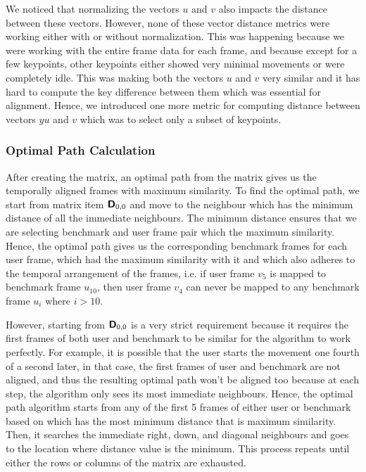 We noticed that normalizing the vectors $u$ and $v$ also impacts the distance between these vectors. However, none of these vector distance metrics were working either with or without normalization. This was happening because we were working with the entire frame data for each frame, and because except for a few keypoints, other keypoints either showed very minimal movements or were completely idle. This was making both the vectors $u$ and $v$ very similar and it has hard to compute the key difference between them which was essential for alignment. Hence, we introduced one more metric for computing distance between vectors $yu$ and $v$ which was to select only a subset of keypoints. 

\subsubsection{Optimal Path Calculation}

After creating the matrix, an optimal path from the matrix gives us the temporally aligned frames with maximum similarity. To find the optimal path, we start from matrix item $\boldsymbol { \mathsf{D}}_{0,0}$ and move to the neighbour which has the minimum distance of all the immediate neighbours. The minimum distance ensures that we are selecting benchmark and user frame pair which the maximum similarity. Hence, the optimal path gives us the corresponding benchmark frames for each user frame, which had the maximum similarity with it and which also adheres to the temporal arrangement of the frames, i.e. if user frame $v_5$ is mapped to benchmark frame $u_{10}$, then user frame $v_4$ can never be mapped to any benchmark frame $u_i$ where $i > 10$. 

However, starting from $\boldsymbol { \mathsf{D}}_{0,0}$ is a very strict requirement because it requires the first frames of both user and benchmark to be similar for the algorithm to work perfectly. For example, it is possible that the user starts the movement one fourth of a second later, in that case, the first frames of user and benchmark are not aligned, and thus the resulting optimal path won't be aligned too because at each step, the algorithm only sees its most immediate neighbours. Hence, the optimal path algorithm starts from any of the first 5 frames of either user or benchmark based on which has the most minimum distance that is maximum similarity. Then, it searches the immediate right, down, and diagonal neighbours and goes to the location where distance value is the minimum. This process repeats until either the rows or columns of the matrix are exhausted. 

